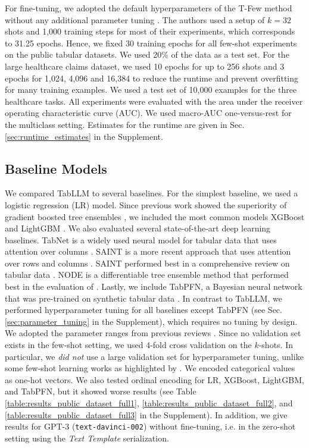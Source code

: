 For fine-tuning, we adopted the default hyperparameters of the T-Few method without any additional parameter tuning \citep{liu_few-shot_2022}. The authors used a setup of $k=32$ shots and 1,000 training steps for most of their experiments, which corresponds to 31.25 epochs. Hence, we fixed 30 training epochs for all few-shot experiments on the public tabular datasets. We used 20\% of the data as a test set. For the large healthcare claims dataset, we used 10 epochs for up to 256 shots and 3 epochs for 1,024, 4,096 and 16,384 to reduce the runtime and prevent overfitting for many training examples. We used a test set of 10,000 examples for the three healthcare tasks. All experiments were evaluated with the area under the receiver operating characteristic curve (AUC). We used macro-AUC one-versus-rest for the multiclass setting. Estimates for the runtime are given in Sec. \ref{sec:runtime_estimates} in the Supplement.

\subsection{Baseline Models}

We compared TabLLM to several baselines. For the simplest baseline, we used a logistic regression (LR) model. Since previous work showed the superiority of gradient boosted tree ensembles \citep{borisov_deep_2022}, we included the most common models XGBoost \citep{chen_xgboost_2016} and LightGBM \citep{ke_lightgbm_2017}. We also evaluated several state-of-the-art deep learning baselines. TabNet is a widely used neural model for tabular data that uses attention over columns \citep{arik_tabnet_2021}. SAINT is a more recent approach that uses attention over rows and columns \citep{somepalli_saint_2021}. SAINT performed best in a comprehensive review on tabular data \citep{borisov_deep_2022}. NODE is a differentiable tree ensemble method that performed best in the evaluation of \citet{shwartz-ziv_tabular_2021}.
Lastly, we include TabPFN, a Bayesian neural network that was pre-trained on synthetic tabular data \citep{hollmann2022tabpfn}. In contrast to TabLLM, we performed hyperparameter tuning for all baselines except TabPFN (see Sec. \ref{sec:parameter_tuning} in the Supplement), which requires no tuning by design. We adopted the parameter ranges from previous reviews \citep{borisov_deep_2022, grinsztajn_why_2022}. Since no validation set exists in the few-shot setting, we used 4-fold cross validation on the $k$-shots. In particular, we \emph{did not} use a large validation set for hyperparameter tuning, unlike some few-shot learning works as highlighted by \citet{perez2021true}.
We encoded categorical values as one-hot vectors. We also tested ordinal encoding for LR, XGBoost, LightGBM, and TabPFN, but it showed worse results (see Table \ref{table:results_public_dataset_full1}, \ref{table:results_public_dataset_full2}, and \ref{table:results_public_dataset_full3} in the Supplement). In addition, we give results for GPT-3 (\texttt{text-davinci-002}) without fine-tuning, i.e. in the zero-shot setting using the \textit{Text Template} serialization.


